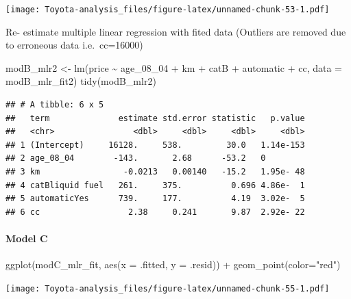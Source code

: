 \documentclass[
]{article}
\newenvironment{Shaded}{\begin{snugshade}}{\end{snugshade}}
\newcommand{\AttributeTok}[1]{\textcolor[rgb]{0.77,0.63,0.00}{#1}}
\newcommand{\FunctionTok}[1]{\textcolor[rgb]{0.00,0.00,0.00}{#1}}
\newcommand{\NormalTok}[1]{#1}
\newcommand{\OtherTok}[1]{\textcolor[rgb]{0.56,0.35,0.01}{#1}}
\newcommand{\SpecialCharTok}[1]{\textcolor[rgb]{0.00,0.00,0.00}{#1}}
\newcommand{\StringTok}[1]{\textcolor[rgb]{0.31,0.60,0.02}{#1}}
\begin{document}
\texttt{[image: Toyota-analysis\_files/figure-latex/unnamed-chunk-53-1.pdf]}

Re- estimate multiple linear regression with fited data (Outliers are
removed due to erroneous data i.e.~cc=16000)

\begin{Shaded}
\begin{Highlighting}[]
\NormalTok{modB\_mlr2 }\OtherTok{\textless{}{-}} \FunctionTok{lm}\NormalTok{(price }\SpecialCharTok{\textasciitilde{}}\NormalTok{ age\_08\_04 }\SpecialCharTok{+}\NormalTok{ km }\SpecialCharTok{+}\NormalTok{ catB }\SpecialCharTok{+} 
\NormalTok{               automatic }\SpecialCharTok{+}\NormalTok{ cc, }\AttributeTok{data =}\NormalTok{ modB\_mlr\_fit2)}
\FunctionTok{tidy}\NormalTok{(modB\_mlr2)}
\end{Highlighting}
\end{Shaded}

\begin{verbatim}
## # A tibble: 6 x 5
##   term              estimate std.error statistic   p.value
##   <chr>                <dbl>     <dbl>     <dbl>     <dbl>
## 1 (Intercept)     16128.     538.         30.0   1.14e-153
## 2 age_08_04        -143.       2.68      -53.2   0        
## 3 km                 -0.0213   0.00140   -15.2   1.95e- 48
## 4 catBliquid fuel   261.     375.          0.696 4.86e-  1
## 5 automaticYes      739.     177.          4.19  3.02e-  5
## 6 cc                  2.38     0.241       9.87  2.92e- 22
\end{verbatim}

\hypertarget{model-c-10}{%
\paragraph{Model C}\label{model-c-10}}

\begin{Shaded}
\begin{Highlighting}[]
\FunctionTok{ggplot}\NormalTok{(modC\_mlr\_fit, }\FunctionTok{aes}\NormalTok{(}\AttributeTok{x =}\NormalTok{ .fitted, }\AttributeTok{y =}\NormalTok{ .resid)) }\SpecialCharTok{+}
  \FunctionTok{geom\_point}\NormalTok{(}\AttributeTok{color=}\StringTok{"red"}\NormalTok{)}
\end{Highlighting}
\end{Shaded}

\texttt{[image: Toyota-analysis\_files/figure-latex/unnamed-chunk-55-1.pdf]}
\end{document}
